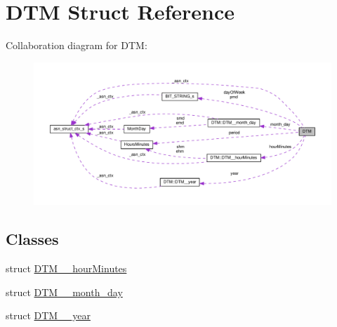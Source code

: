 \hypertarget{structDTM}{}\section{D\+TM Struct Reference}
\label{structDTM}


Collaboration diagram for D\+TM\+:\nopagebreak
\begin{figure}[H]
\begin{center}
\leavevmode
\includegraphics[width=350pt]{structDTM__coll__graph}
\end{center}
\end{figure}
\subsection*{Classes}
\begin{DoxyCompactItemize}
\item 
struct \hyperlink{structDTM_1_1DTM____hourMinutes}{D\+T\+M\+\_\+\+\_\+hour\+Minutes}
\item 
struct \hyperlink{structDTM_1_1DTM____month__day}{D\+T\+M\+\_\+\+\_\+month\+\_\+day}
\item 
struct \hyperlink{structDTM_1_1DTM____year}{D\+T\+M\+\_\+\+\_\+year}
\end{DoxyCompactItemize}
